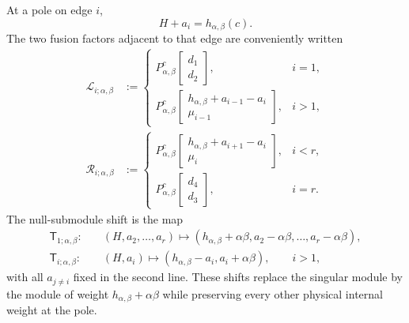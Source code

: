 \documentclass[11pt]{article}
\begin{document}
At a pole on edge $i$,
\begin{equation}
 H+a_i=h_{\alpha,\beta}(c).
 \label{eq:npoint-edge-pole}
\end{equation}
The two fusion factors adjacent to that edge are conveniently written
\begin{align}
 \mathcal L_{i;\alpha,\beta}
 &:={}
 \begin{cases}
 P_{\alpha,\beta}^{c}\!\begin{bmatrix}d_1\\d_2\end{bmatrix},&i=1,\\[3pt]
 P_{\alpha,\beta}^{c}\!\begin{bmatrix}
 h_{\alpha,\beta}+a_{i-1}-a_i\\\mu_{i-1}
 \end{bmatrix},&i>1,
 \end{cases}
 \label{eq:npoint-left-residue}\\
 \mathcal R_{i;\alpha,\beta}
 &:={}
 \begin{cases}
 P_{\alpha,\beta}^{c}\!\begin{bmatrix}
 h_{\alpha,\beta}+a_{i+1}-a_i\\\mu_i
 \end{bmatrix},&i<r,\\[3pt]
 P_{\alpha,\beta}^{c}\!\begin{bmatrix}d_4\\d_3\end{bmatrix},&i=r.
 \end{cases}
 \label{eq:npoint-right-residue}
\end{align}
The null-submodule shift is the map
\begin{align}
 \mathsf T_{1;\alpha,\beta}:&\quad
 (H,a_2,\ldots,a_r)\longmapsto
 (h_{\alpha,\beta}+\alpha\beta,
  a_2-\alpha\beta,\ldots,a_r-\alpha\beta),
 \label{eq:npoint-base-shift}\\
 \mathsf T_{i;\alpha,\beta}:&\quad
 (H,a_i)\longmapsto
 (h_{\alpha,\beta}-a_i,a_i+\alpha\beta),
 \qquad i>1,
 \label{eq:npoint-nonbase-shift}
\end{align}
with all $a_{j\ne i}$ fixed in the second line.  These shifts replace the
singular module by the module of weight
$h_{\alpha,\beta}+\alpha\beta$ while preserving every
other physical internal weight at the pole.
\end{document}
